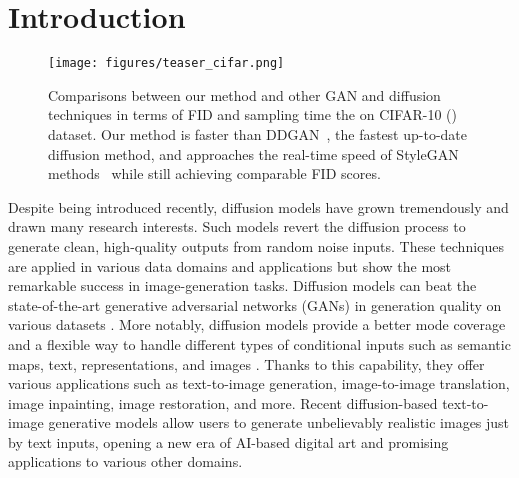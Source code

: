\documentclass[10pt,twocolumn,letterpaper]{article}
\begin{document}
\section{Introduction} \label{sec:intro}
\begin{figure}[t]
  \centering
\texttt{[image: figures/teaser\_cifar.png]}
   \vspace{-7mm}
   \caption{Comparisons between our method and other GAN and diffusion techniques in terms of FID and sampling time the on CIFAR-10 () dataset. Our method is  faster than DDGAN~\cite{xiao2021tackling}, the fastest up-to-date diffusion method, and approaches the real-time speed of StyleGAN methods~\cite{karras2019style,karras2020training,zhao2020differentiable} while still achieving comparable FID scores.}
   \label{fig:teaser}
   \vspace{-2mm}
\end{figure}
Despite being introduced recently, diffusion models have grown tremendously and drawn many research interests. Such models revert the diffusion process to generate clean, high-quality outputs from random noise inputs. These techniques are applied in various data domains and applications but show the most remarkable success in image-generation tasks. Diffusion models can beat the state-of-the-art generative adversarial networks (GANs) in generation quality on various datasets \cite{dhariwal2021diffusion,saharia2022photorealistic}. More notably, diffusion models provide a better mode coverage \cite{song2021maximum,kingma2021variational,huang2021variational} and a flexible way to handle different types of conditional inputs such as semantic maps, text, representations, and images \cite{rombach2022high}. Thanks to this capability, they offer various applications such as text-to-image generation, image-to-image translation, image inpainting, image restoration, and more. Recent diffusion-based text-to-image generative models \cite{ramesh2022hierarchical,BibEntry2022Nov,saharia2022photorealistic} allow users to generate unbelievably realistic images just by text inputs, opening a new era of AI-based digital art and promising applications to various other domains.
\end{document}
